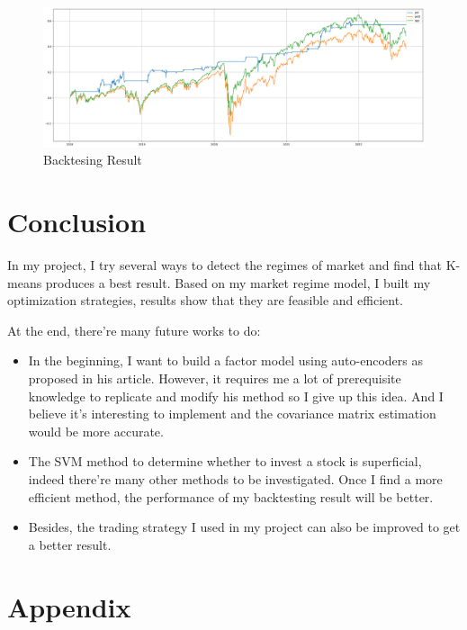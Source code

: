 \documentclass[a4paper,12pt]{article}
\begin{document}
\begin{figure}[H]
    \centering
    \includegraphics[scale=0.3]{backtest1.png}
    \caption{Backtesing Result}\label{backtest1}
\end{figure}

\section{Conclusion}

In my project, I try several ways to detect the regimes of market and find that K-means produces a best result. Based on my market regime model, I built my optimization strategies, results show that they are feasible and efficient.

At the end, there're many future works to do:

\begin{itemize}
    \item In the beginning, I want to build a factor model using auto-encoders as \cite{gu_autoencoder_2021} proposed in his article. However, it requires me a lot of prerequisite knowledge to replicate and modify his method so I give up this idea. And I believe it's interesting to implement and the covariance matrix estimation would be more accurate.
    \item The SVM method to determine whether to invest a stock is superficial, indeed there're many other methods to be investigated. Once I find a more efficient method, the performance of my backtesting result will be better.
    \item Besides, the trading strategy I used in my project can also be improved to get a better result.
\end{itemize}

\section{Appendix}
\end{document}
